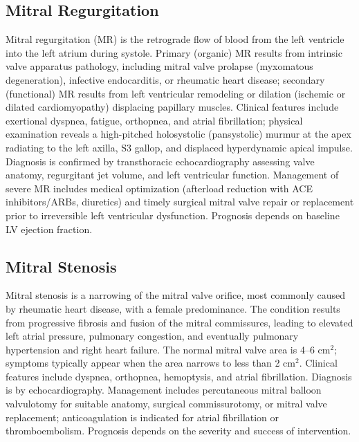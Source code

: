 \subsection{Mitral Regurgitation}
\label{sec:Mitral Regurgitation}
Mitral regurgitation (MR) is the retrograde flow of blood from the left ventricle into the left atrium during systole. Primary (organic) MR results from intrinsic valve apparatus pathology, including mitral valve prolapse (myxomatous degeneration), infective endocarditis, or rheumatic heart disease; secondary (functional) MR results from left ventricular remodeling or dilation (ischemic or dilated cardiomyopathy) displacing papillary muscles. Clinical features include exertional dyspnea, fatigue, orthopnea, and atrial fibrillation; physical examination reveals a high-pitched holosystolic (pansystolic) murmur at the apex radiating to the left axilla, S3 gallop, and displaced hyperdynamic apical impulse. Diagnosis is confirmed by transthoracic echocardiography assessing valve anatomy, regurgitant jet volume, and left ventricular function. Management of severe MR includes medical optimization (afterload reduction with ACE inhibitors/ARBs, diuretics) and timely surgical mitral valve repair or replacement prior to irreversible left ventricular dysfunction. Prognosis depends on baseline LV ejection fraction.

\subsection{Mitral Stenosis}
\label{sec:Mitral Stenosis}
Mitral stenosis is a narrowing of the mitral valve orifice, most commonly caused by rheumatic heart disease, with a female predominance. The condition results from progressive fibrosis and fusion of the mitral commissures, leading to elevated left atrial pressure, pulmonary congestion, and eventually pulmonary hypertension and right heart failure. The normal mitral valve area is 4--6 cm$^2$; symptoms typically appear when the area narrows to less than 2 cm$^2$. Clinical features include dyspnea, orthopnea, hemoptysis, and atrial fibrillation. Diagnosis is by echocardiography. Management includes percutaneous mitral balloon valvulotomy for suitable anatomy, surgical commissurotomy, or mitral valve replacement; anticoagulation is indicated for atrial fibrillation or thromboembolism. Prognosis depends on the severity and success of intervention.

